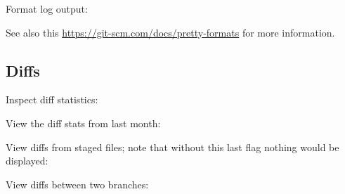 \begin{flushleft}
\end{flushleft}

\begin{flushleft}
	Format log output:
\end{flushleft}

\begin{flushleft}
\end{flushleft}

\begin{flushleft}
	See also this \url{https://git-scm.com/docs/pretty-formats} for more information.
\end{flushleft}


\subsection{Diffs}\label{git-diffs}

\begin{flushleft}
	Inspect diff statistics:
\end{flushleft}

\begin{flushleft}
\end{flushleft}

\begin{flushleft}
	View the diff stats from last month:
\end{flushleft}

\begin{flushleft}
\end{flushleft}

\begin{flushleft}
	View diffs from staged files; note that without this last flag nothing would be displayed:
\end{flushleft}

\begin{flushleft}
\end{flushleft}

\begin{flushleft}
	View diffs between two branches:
\end{flushleft}

\begin{flushleft}
\end{flushleft}

